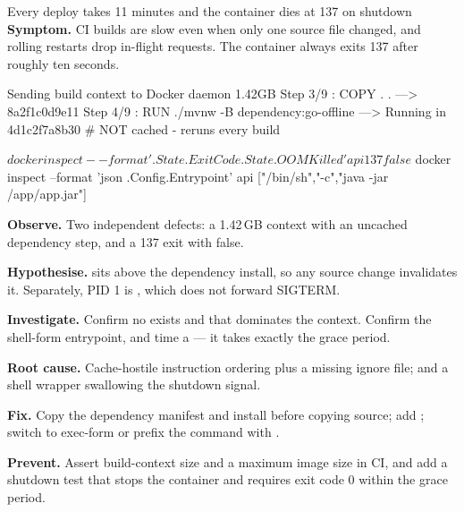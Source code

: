 \begin{debuglab}{Every deploy takes 11 minutes and the container dies at 137 on shutdown}
\textbf{Symptom.} CI builds are slow even when only one source file changed, and rolling restarts drop in-flight requests. The container always exits 137 after roughly ten seconds.

\begin{outbox}
Sending build context to Docker daemon  1.42GB
Step 3/9 : COPY . .
 ---> 8a2f1c0d9e11
Step 4/9 : RUN ./mvnw -B dependency:go-offline
 ---> Running in 4d1c2f7a8b30      # NOT cached - reruns every build

$ docker inspect --format '{{.State.ExitCode}} {{.State.OOMKilled}}' api
137 false
$ docker inspect --format '{{json .Config.Entrypoint}}' api
["/bin/sh","-c","java -jar /app/app.jar"]
\end{outbox}

\begin{tickcheck}
  \item \textbf{Observe.} Two independent defects: a 1.42\,GB context with an uncached dependency step, and a 137 exit with  false.
  \item \textbf{Hypothesise.}  sits above the dependency install, so any source change invalidates it. Separately, PID 1 is , which does not forward SIGTERM.
  \item \textbf{Investigate.} Confirm no  exists and that  dominates the context. Confirm the shell-form entrypoint, and time a  --- it takes exactly the grace period.
  \item \textbf{Root cause.} Cache-hostile instruction ordering plus a missing ignore file; and a shell wrapper swallowing the shutdown signal.
  \item \textbf{Fix.} Copy the dependency manifest and install before copying source; add ; switch to exec-form  or prefix the command with .
  \item \textbf{Prevent.} Assert build-context size and a maximum image size in CI, and add a shutdown test that stops the container and requires exit code 0 within the grace period.
\end{tickcheck}
\end{debuglab}

